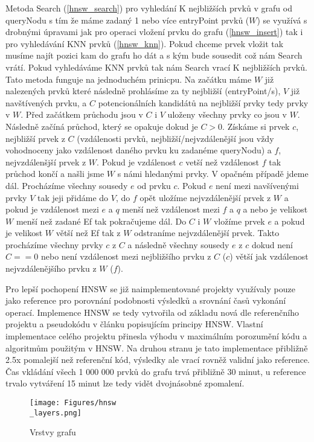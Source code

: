 \documentclass[czech,semestral,dept460,male,csharp,cpdeclaration]{diploma}
\begin{document}
		Metoda Search (\ref{hnsw_search}) pro vyhledání K nejbližších prvků v grafu od queryNodu s tím že máme zadaný 1 nebo více entryPoint prvků ($W$) se využívá s drobnými úpravami jak pro operaci vložení prvku do grafu (\ref{hnsw_insert}) tak i pro vyhledávání KNN prvků (\ref{hnsw_knn}). Pokud chceme prvek vložit tak musíme najít pozici kam do grafu ho dát a s kým bude sousedit což nám Search vrátí. Pokud vyhledáváme KNN prvků tak nám Search vrací K nejbližších prvků. Tato metoda funguje na jednoduchém prinicpu. Na začátku máme $W$ již nalezených prvků které následně prohlásíme za ty nejbližší (entryPoint/s), $V$ již navštívených prvku, a $C$ potencionálních kandidátů na nejbližší prvky tedy prvky v $W$. Před začátkem průchodu jsou v $C$ i $V$ uloženy všechny prvky co jsou v $W$. Následně začíná průchod, který se opakuje dokud je $C > 0$. Získáme si prvek $c$, nejbližší prvek z $C$ (vzdálenosti prvků, nejbližší/nejvzdálenější jsou vždy vohodnoceny jako vzdálenost daného prvku ku zadanéme queryNodu) a $f$, nejvzdálenšjší prvek z $W$. Pokud je vzdálenost $c$ vetší než vzdálenost $f$ tak průchod končí a našli jsme $W$ s námi hledanými prvky. V opačném případě jdeme dál. Procházíme všechny sousedy $e$ od prvku $c$. Pokud $e$ není mezi navšívenými prvky $V$ tak jeji přidáme do $V$, do $f$ opět uložíme nejvzdálenější prvek z $W$ a pokud je vzdálenost mezi $e$ a $q$ menší než vzdálenost mezi $f$ a $q$ a nebo je velikost $W$ menší než zadané Ef tak pokračujeme dál. Do $C$ i $W$ vložíme prvek $e$ a pokud je velikost $W$ větší než Ef tak z $W$ odstraníme nejvzdálenější prvek. Takto procházíme všechny prvky $c$ z $C$ a následně všechny sousedy $e$ z $c$ dokud není $C == 0$ nebo není vzdálenost mezi nejbližšího prvku z $C$ ($c$) větší jak vzdálenost nejvzdálenějšího prvku z $W$ ($f$).
	
		Pro lepší pochopení HNSW se již naimplementované projekty \cite{git-hnswlib} \cite{git-hnsw} využívaly pouze jako reference pro porovnání podobnosti výsledků a srovnání časů vykonání operací. Implemence HNSW se tedy vytvořila od základu nová dle referenčního projektu a pseudokódu v článku popisujícím principy HNSW. Vlastní implementace celého projektu přinesla výhodu v maximálním porozumění kódu a algoritmům použitým v HNSW. Na druhou stranu je tato implementace přibližně 2.5x pomalejší než referenční kód, výsledky ale vrací rovněž validní jako reference. Čas vkládání všech 1 000 000 prvků do grafu trvá přibližně 30 minut, u reference trvalo vytváření 15 minut lze tedy vidět dvojnásobné zpomalení.
		
		\begin{figure}
			\centering
			\texttt{[image: Figures/hnsw\\\_layers.png]}
			\caption{Vrstvy grafu}
			\label{hnsw_layers}
		\end{figure}
		
\end{document}
